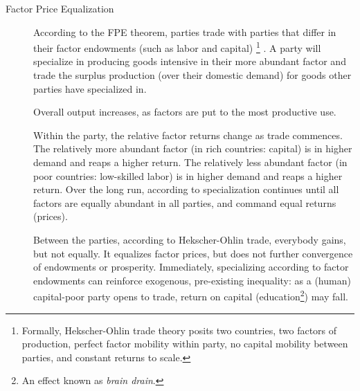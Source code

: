 \begin{description}

	\item[Factor Price Equalization] \label{it:FPE} According to the \gls{FPE} theorem, parties trade with parties that differ in their factor endowments (such as labor and capital) \footnote{
		Formally, Hekscher-Ohlin trade theory posits two countries, two factors of production, perfect factor mobility within party, no capital mobility between parties, and constant returns to scale.}
	\citep{Stolper1941}. A party will specialize in producing goods intensive in their more abundant factor and trade the surplus production (over their domestic demand) for goods other parties have specialized in.

	Overall output increases, as factors are put to the most productive use.

	Within the party, the relative factor returns change as trade commences. The relatively more abundant factor (in rich countries: capital) is in higher demand and reaps a higher return. The relatively less abundant factor (in poor countries: low-skilled labor) is in higher demand and reaps a higher return. Over the long run, according to \cite{Stolper1941} specialization continues until all factors are equally abundant in all parties, and command equal returns (prices).

	Between the parties, according to Hekscher-Ohlin trade, everybody gains, but not equally. It equalizes factor prices, but does not further convergence of endowments or prosperity. Immediately, specializing according to factor endowments can reinforce exogenous, pre-existing inequality: as a (human) capital-poor party opens to trade, return on capital (education\footnote{
		An effect known as \emph{brain drain}.})
	may fall.



\end{description}

